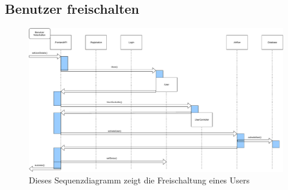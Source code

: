 \subsection{Benutzer freischalten}
\begin{figure}[H]
	\centering
	\includegraphics[width=\textwidth]{res/BenutzerFreischaltenSequence.pdf} 
	\caption{Dieses Sequenzdiagramm zeigt die Freischaltung eines Users}
\end{figure}